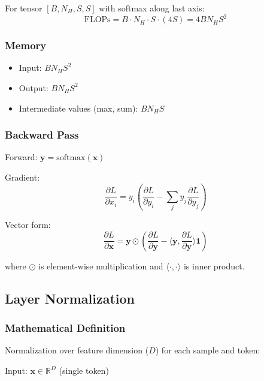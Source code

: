 \documentclass[10pt]{article}
\begin{document}
For tensor $[B,N_H,S,S]$ with softmax along last axis:
\begin{equation}
\text{FLOPs} = B \cdot N_H \cdot S \cdot (4S) = 4BN_H S^2
\end{equation}

\subsubsection{Memory}

\begin{itemize}
  \item Input: $BN_H S^2$
  \item Output: $BN_H S^2$
  \item Intermediate values (max, sum): $BN_H S$
\end{itemize}

\subsubsection{Backward Pass}

Forward: $\mathbf{y} = \text{softmax}(\mathbf{x})$

Gradient:
\begin{equation}
\frac{\partial L}{\partial x_i} = y_i \left( \frac{\partial L}{\partial y_i} - \sum_{j} y_j \frac{\partial L}{\partial y_j} \right)
\end{equation}

Vector form:
\begin{equation}
\frac{\partial L}{\partial \mathbf{x}} = \mathbf{y} \odot \left( \frac{\partial L}{\partial \mathbf{y}} - \langle \mathbf{y}, \frac{\partial L}{\partial \mathbf{y}} \rangle \mathbf{1} \right)
\end{equation}

where $\odot$ is element-wise multiplication and $\langle \cdot, \cdot \rangle$ is inner product.

\subsection{Layer Normalization}
\label{subsec:layernorm}

\subsubsection{Mathematical Definition}

Normalization over feature dimension ($D$) for each sample and token:

Input: $\mathbf{x} \in \mathbb{R}^{D}$ (single token)
\end{document}
